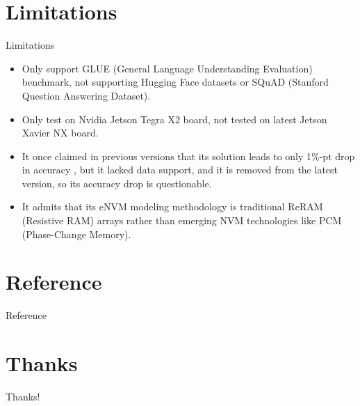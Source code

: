 \documentclass[12pt]{beamer}
\begin{document}
\section{Limitations}
\begin{frame}{Limitations}
    \begin{itemize}
        \item Only support GLUE (General Language Understanding Evaluation) benchmark, not supporting Hugging Face datasets or SQuAD (Stanford Question Answering Dataset).
        \item Only test on Nvidia Jetson Tegra X2 board, not tested on latest Jetson Xavier NX board.
        \item It once claimed in previous versions that its solution leads to only 1\%-pt drop in accuracy \cite{tambe2021edgebert}, but it lacked data support, and it is removed from the latest version, so its accuracy drop is questionable.
        \item It admits that its eNVM modeling methodology is traditional ReRAM (Resistive RAM) arrays rather than emerging NVM technologies like PCM (Phase-Change Memory).
    \end{itemize}
\end{frame}
\section{Reference}
\begin{frame}{Reference}
    \printbibliography
\end{frame}
\section{Thanks}
\begin{frame}
\begin{center}
    \Huge Thanks!
\end{center}
\end{frame}
\end{document}
